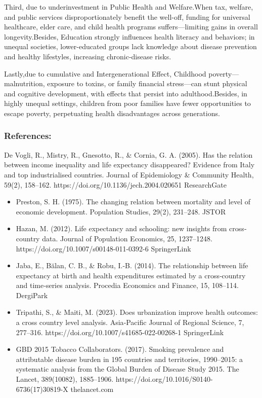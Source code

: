 \documentclass[
  11pt,
]{article}
\begin{document}
Third, due to underinvestment in Public Health and Welfare.When tax,
welfare, and public services disproportionately benefit the well-off,
funding for universal healthcare, elder care, and child health programs
suffers---limiting gains in overall longevity.Besides, Education
strongly influences health literacy and behaviors; in unequal societies,
lower-educated groups lack knowledge about disease prevention and
healthy lifestyles, increasing chronic‐disease risks.

Lastly,due to cumulative and Intergenerational Effect, Childhood
poverty---malnutrition, exposure to toxins, or family financial
stress---can stunt physical and cognitive development, with effects that
persist into adulthood.Besides, in highly unequal settings, children
from poor families have fewer opportunities to escape poverty,
perpetuating health disadvantages across generations.

\subsubsection{References:}\label{references}

De Vogli, R., Mistry, R., Gnesotto, R., \& Cornia, G. A. (2005). Has the
relation between income inequality and life expectancy disappeared?
Evidence from Italy and top industrialised countries. Journal of
Epidemiology \& Community Health, 59(2), 158--162.
https://doi.org/10.1136/jech.2004.020651 ResearchGate

\begin{itemize}
\item
  Preston, S. H. (1975). The changing relation between mortality and
  level of economic development. Population Studies, 29(2), 231--248.
  JSTOR
\item
  Hazan, M. (2012). Life expectancy and schooling: new insights from
  cross‐country data. Journal of Population Economics, 25, 1237--1248.
  https://doi.org/10.1007/s00148-011-0392-6 SpringerLink
\item
  Jaba, E., Bălan, C. B., \& Robu, I.-B. (2014). The relationship
  between life expectancy at birth and health expenditures estimated by
  a cross‐country and time‐series analysis. Procedia Economics and
  Finance, 15, 108--114. DergiPark
\item
  Tripathi, S., \& Maiti, M. (2023). Does urbanization improve health
  outcomes: a cross country level analysis. Asia‐Pacific Journal of
  Regional Science, 7, 277--316.
  https://doi.org/10.1007/s41685-022-00268-1 SpringerLink
\item
  GBD 2015 Tobacco Collaborators. (2017). Smoking prevalence and
  attributable disease burden in 195 countries and territories,
  1990--2015: a systematic analysis from the Global Burden of Disease
  Study 2015. The Lancet, 389(10082), 1885--1906.
  https://doi.org/10.1016/S0140-6736(17)30819-X thelancet.com
\end{itemize}
\end{document}
